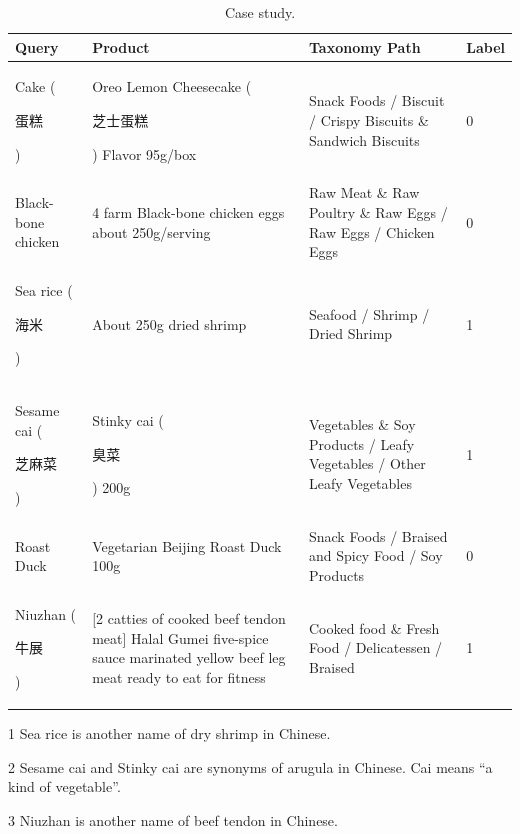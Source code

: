 \begin{table}[th]
  \centering
  \setlength{\tabcolsep}{3pt}
  \begin{threeparttable}
  \caption{Case study.}
  \label{tb:case}
  \centering
  \begin{tabular}{p{3cm} p{6cm} p{6cm} p{1cm}}
    \toprule
    Query & Product & Taxonomy Path & Label \\
    \midrule
    Cake (\begin{CJK}{UTF8}{gbsn}蛋糕\end{CJK}) & Oreo Lemon Cheesecake (\begin{CJK}{UTF8}{gbsn}芝士蛋糕\end{CJK}) Flavor 95g/box & Snack Foods / Biscuit / Crispy Biscuits \& Sandwich Biscuits & 0 \\
    Black-bone chicken & 4 farm Black-bone chicken eggs about 250g/serving & Raw Meat \& Raw Poultry \& Raw Eggs / Raw Eggs / Chicken Eggs & 0 \\
    Sea rice (\begin{CJK}{UTF8}{gbsn}海米\end{CJK}) & About 250g dried shrimp & Seafood / Shrimp / Dried Shrimp & 1 \\
    Sesame cai (\begin{CJK}{UTF8}{gbsn}芝麻菜\end{CJK}) & Stinky cai (\begin{CJK}{UTF8}{gbsn}臭菜\end{CJK}) 200g & Vegetables \& Soy Products / Leafy Vegetables / Other Leafy Vegetables & 1 \\
    Roast Duck & Vegetarian Beijing Roast Duck 100g & Snack Foods / Braised and Spicy Food / Soy Products & 0 \\
    Niuzhan (\begin{CJK}{UTF8}{gbsn}牛展\end{CJK}) & [2 catties of cooked beef tendon meat] Halal Gumei five-spice sauce marinated yellow beef leg meat ready to eat for fitness & Cooked food \& Fresh Food / Delicatessen / Braised & 1 \\
    \bottomrule
  \end{tabular}
  \begin{tablenotes}
    \item[1] Sea rice is another name of dry shrimp in Chinese.
    \item[2] Sesame cai and Stinky cai are synonyms of arugula in Chinese. Cai means ``a kind of vegetable''.
    \item[3] Niuzhan is another name of beef tendon in Chinese.
  \end{tablenotes}
  \end{threeparttable}
\end{table}

